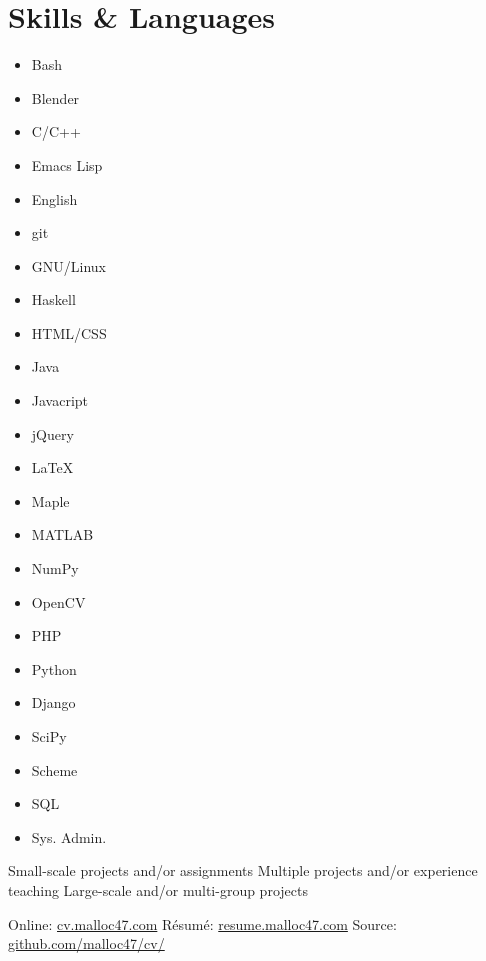 \documentclass[10pt]{article}
\begin{document}
\begin{minipage}{\linewidth}
\newcommand{\skills}[2]{
  \item #2 #1
}
\section{Skills \& Languages}
\begin{multicols}{4}
\raggedcolumns
\begin{itemize}
\renewcommand{\labelitemi}{}
\setlength{\itemsep}{1pt}
\setlength{\parskip}{0pt}
\setlength{\parsep}{0pt}

\skills{Bash}{\threeskill}
\skills{Blender}{\twoskill}
\skills{C/C++}{\threeskill }
\skills{Emacs Lisp}{\oneskill}
\skills{English}{\threeskill}
\skills{git}{\twoskill}
\skills{GNU/Linux}{\threeskill}
\skills{Haskell}{\oneskill}
\skills{HTML/CSS}{\threeskill}
\skills{Java}{\threeskill}
\skills{Javacript}{\twoskill}
\skills{jQuery}{\twoskill}
\skills{\LaTeX}{\twoskill}
\skills{Maple}{\twoskill}
\skills{MATLAB}{\threeskill}
\skills{NumPy}{\threeskill}
\skills{OpenCV}{\threeskill}
\skills{PHP}{\oneskill}
\skills{Python}{\threeskill}
\skills{Django}{\twoskill}
\skills{SciPy}{\threeskill}
\skills{Scheme}{\threeskill}
\skills{SQL}{\twoskill}
\skills{Sys. Admin.}{\threeskill}

\end{itemize}
\end{multicols}
\begin{footnotesize}
  \oneskill Small-scale projects and/or assignments \hfill 
  \twoskill Multiple projects and/or experience teaching \hfill
  \threeskill Large-scale and/or multi-group projects
\end{footnotesize}
\end{minipage}


\null\vfill
\footnotesize{
  Online:  \href{http://cv.malloc47.com}{cv.malloc47.com} \hfill
  Résumé: \href{http://resume.malloc47.com}{resume.malloc47.com} \hfill 
  Source:  \href{https://github.com/malloc47/cv/tree/master}{github.com/malloc47/cv/}
}

\end{document}
